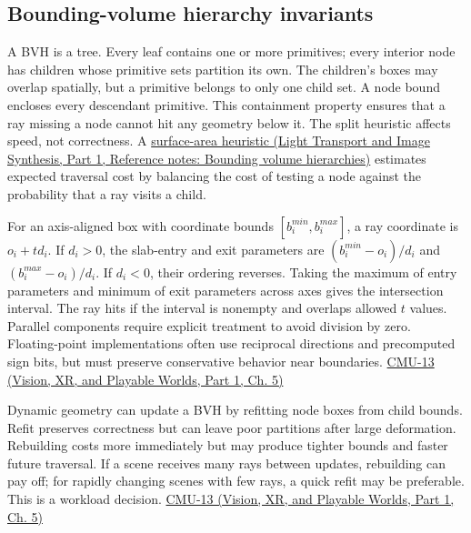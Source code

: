 \subsection{Bounding-volume hierarchy invariants}\label{04-visual-computing-ii-ch029-bounding-volume-hierarchy-invariants}

\hypertarget{04-visual-computing-ii-ch029-bounding-volume-hierarchy-invariants}{}

A BVH is a tree. Every leaf contains one or more primitives; every interior node has children whose primitive sets partition its own. The children's boxes may overlap spatially, but a primitive belongs to only one child set. A node bound encloses every descendant primitive. This containment property ensures that a ray missing a node cannot hit any geometry below it. The split heuristic affects speed, not correctness. A \href{../04-Light-Transport-and-Image-Synthesis-P01/main.pdf\#nameddest=appendix-0b426c47dd78}{surface-area heuristic (Light Transport and Image Synthesis, Part 1, Reference notes: Bounding volume hierarchies)} estimates expected traversal cost by balancing the cost of testing a node against the probability that a ray visits a child.

For an axis-aligned box with coordinate bounds \([b_i^{min},b_i^{max}]\), a ray coordinate is \(o_i+td_i\). If \(d_i>0\), the slab-entry and exit parameters are \((b_i^{min}-o_i)/d_i\) and \((b_i^{max}-o_i)/d_i\). If \(d_i<0\), their ordering reverses. Taking the maximum of entry parameters and minimum of exit parameters across axes gives the intersection interval. The ray hits if the interval is nonempty and overlaps allowed \(t\) values. Parallel components require explicit treatment to avoid division by zero. Floating-point implementations often use reciprocal directions and precomputed sign bits, but must preserve conservative behavior near boundaries. \href{../07-Vision-XR-and-Playable-Worlds-P01/main.pdf\#nameddest=04-visual-computing-ii-ch036-cmu-13---spatial-data-structures}{CMU-13 (Vision, XR, and Playable Worlds, Part 1, Ch. 5)}

Dynamic geometry can update a BVH by refitting node boxes from child bounds. Refit preserves correctness but can leave poor partitions after large deformation. Rebuilding costs more immediately but may produce tighter bounds and faster future traversal. If a scene receives many rays between updates, rebuilding can pay off; for rapidly changing scenes with few rays, a quick refit may be preferable. This is a workload decision. \href{../07-Vision-XR-and-Playable-Worlds-P01/main.pdf\#nameddest=04-visual-computing-ii-ch036-cmu-13---spatial-data-structures}{CMU-13 (Vision, XR, and Playable Worlds, Part 1, Ch. 5)}

